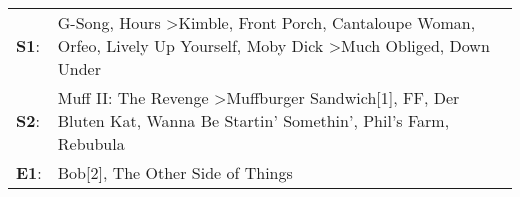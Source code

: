 \begin{supertabular}{p{0.03\textwidth}p{0.92\textwidth}}
 \textbf{S1}:  &  G-Song\textsuperscript{}, \enspace Hours\textsuperscript{} \textgreater \enspace Kimble\textsuperscript{}, \enspace Front Porch\textsuperscript{}, \enspace Cantaloupe Woman\textsuperscript{}, \enspace Orfeo\textsuperscript{}, \enspace Lively Up Yourself\textsuperscript{}, \enspace Moby Dick\textsuperscript{} \textgreater \enspace Much Obliged\textsuperscript{}, \enspace Down Under\textsuperscript{}  \enspace  \\
 \textbf{S2}:  &                                                                                               Muff II: The Revenge\textsuperscript{} \textgreater \enspace Muffburger Sandwich[1]\textsuperscript{}, \enspace FF\textsuperscript{}, \enspace Der Bluten Kat\textsuperscript{}, \enspace Wanna Be Startin' Somethin'\textsuperscript{}, \enspace Phil's Farm\textsuperscript{}, \enspace Rebubula\textsuperscript{}  \enspace  \\
 \textbf{E1}:  &                                                                                                                                                                                                                                                                                                                                      Bob[2]\textsuperscript{}, \enspace The Other Side of Things\textsuperscript{}  \enspace  \\
\end{supertabular}
